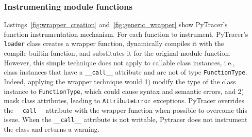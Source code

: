 \documentclass[11pt]{article}
\newcommand{\tristan}[1]{\color{orange}\textbf{From Tristan:} #1\color{black}\xspace}
\newcommand{\Yohan}[1]{\color{green!75!black}\textbf{Yohan:} #1\color{black}\xspace}
\newcommand{\pytracer}[0]{PyTracer\xspace}
\begin{document}


\subsubsection{Instrumenting module functions}

Listings~\ref{fig:wrapper_creation} and~\ref{fig:generic_wrapper} show \pytracer's function instrumentation mechanism.
For each function to instrument, \pytracer's \texttt{loader} class creates a wrapper function, dynamically compiles it with the compile builtin function, and substitutes it for the original module function.  However, this simple technique does not apply to callable class instances, i.e., class instances that have a \texttt{\_\_call\_\_} attribute and are not of type \texttt{FunctionType}. Indeed, applying the wrapper technique would 1) modify the type of the class instance to \texttt{FunctionType}, which could cause syntax and semantic errors, and 2) mask class attributes, leading to \texttt{AttributeError} exceptions.
\pytracer overrides the \texttt{\_\_call\_\_} attribute with the wrapper function when possible to overcome this issue.
When the \texttt{\_\_call\_\_} attribute is not writable,  Pytracer does not instrument the class and returns a warning. 
\end{document}
